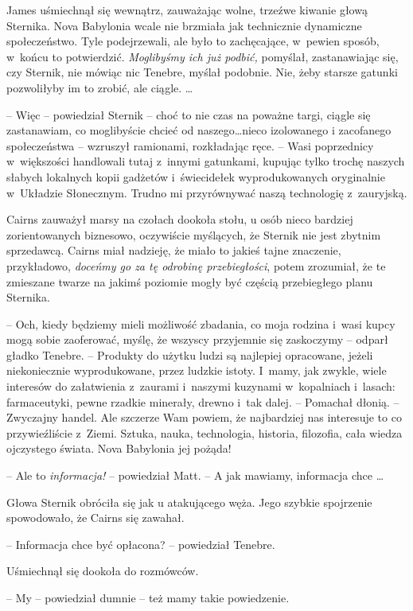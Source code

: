 \documentclass[oneside,polish,12pt,sfheadings]{mwbk}
\begin{document}
James uśmiechnął się wewnątrz, zauważając wolne, trzeźwe kiwanie głową
Sternika. Nova Babylonia wcale nie brzmiała jak technicznie dynamiczne
społeczeństwo. Tyle podejrzewali, ale było to zachęcające, w~pewien
sposób, w~końcu to potwierdzić. \emph{Moglibyśmy ich już podbić, }
pomyślał, zastanawiając się, czy Sternik, nie mówiąc nic Tenebre, myślał
podobnie. Nie, żeby starsze gatunki pozwoliłyby im to zrobić, ale
ciągle. \ldots

-- Więc -- powiedział Sternik -- choć to nie czas na poważne targi, ciągle
się zastanawiam, co moglibyście chcieć od naszego\ldots nieco izolowanego
i zacofanego społeczeństwa -- wzruszył ramionami, rozkładając ręce. --
Wasi poprzednicy w~większości handlowali tutaj z~innymi gatunkami,
kupując tylko trochę naszych słabych lokalnych kopii gadżetów i~świecidełek wyprodukowanych oryginalnie w~Układzie Słonecznym. Trudno mi
przyrównywać naszą technologię z~zauryjską.

Cairns zauważył marsy na czołach dookoła stołu, u osób nieco bardziej
zorientowanych biznesowo, oczywiście myślących, że Sternik nie jest
zbytnim sprzedawcą. Cairns miał nadzieję, że miało to jakieś tajne
znaczenie, przykładowo, \emph{doceńmy go za tę odrobinę przebiegłości},
potem zrozumiał, że te zmieszane twarze na jakimś poziomie mogły być
częścią przebiegłego planu Sternika.

-- Och, kiedy będziemy mieli możliwość zbadania, co moja rodzina i~wasi
kupcy mogą sobie zaoferować, myślę, że wszyscy przyjemnie się zaskoczymy
-- odparł gładko Tenebre. -- Produkty do użytku ludzi są najlepiej
opracowane, jeżeli niekoniecznie wyprodukowane, przez ludzkie istoty. I~mamy, jak zwykle, wiele interesów do załatwienia z~zaurami i~naszymi
kuzynami w~kopalniach i~lasach: farmaceutyki, pewne rzadkie minerały,
drewno i~tak dalej. -- Pomachał dłonią. -- Zwyczajny handel. Ale szczerze
Wam powiem, że najbardziej nas interesuje to co przywieźliście z~Ziemi.
Sztuka, nauka, technologia, historia, filozofia, cała wiedza ojczystego
świata. Nova Babylonia jej pożąda!

-- Ale to \emph{informacja!} -- powiedział Matt. -- A jak mawiamy,
informacja chce \ldots

Głowa Sternik obróciła się jak u atakującego węża. Jego szybkie
spojrzenie spowodowało, że Cairns się zawahał.

-- Informacja chce być opłacona? -- powiedział Tenebre. 

Uśmiechnął się dookoła do rozmówców. 

-- My -- powiedział dumnie -- też mamy takie
powiedzenie.
\end{document}
